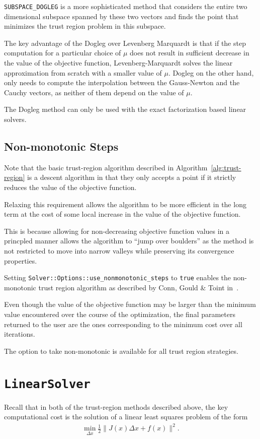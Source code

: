  \texttt{SUBSPACE\_DOGLEG} is a more sophisticated method
that considers the entire two dimensional subspace spanned by these
two vectors and finds the point that minimizes the trust region
problem in this subspace\cite{byrd1988approximate}.

The key advantage of the Dogleg over Levenberg Marquardt is that if the step computation for a particular choice of $\mu$ does not result in sufficient decrease in the value of the objective function, Levenberg-Marquardt solves the linear approximation from scratch with a smaller value of $\mu$. Dogleg on the other hand, only needs to compute the interpolation between the Gauss-Newton and the Cauchy vectors, as neither of them depend on the value of $\mu$.

The Dogleg method can only be used with the exact factorization based linear solvers.

\subsection{Non-monotonic Steps}
\label{sec:non-monotic}
Note that the basic trust-region algorithm described in
Algorithm~\ref{alg:trust-region} is a descent algorithm  in that they
only accepts a point if it strictly reduces the value of the objective
function.

Relaxing this requirement allows the algorithm to be more
efficient in the long term at the cost of some local increase
in the value of the objective function.

This is because allowing for non-decreasing objective function
values in a princpled manner allows the algorithm to ``jump over
boulders'' as the method is not restricted to move into narrow
valleys while preserving its convergence properties.

Setting \texttt{Solver::Options::use\_nonmonotonic\_steps} to \texttt{true}
enables the non-monotonic trust region algorithm as described by
Conn,  Gould \& Toint in~\cite{conn2000trust}.

Even though the value of the objective function may be larger
than the minimum value encountered over the course of the
optimization, the final parameters returned to the user are the
ones corresponding to the minimum cost over all iterations.

The option to take non-monotonic is available for all trust region
strategies.

\section{\texttt{LinearSolver}}
Recall that in both of the trust-region methods described above, the key computational cost is the solution of a linear least squares problem of the form
\begin{align}
 \min_{\Delta x} \frac{1}{2} \|J(x)\Delta x + f(x)\|^2 .
 \label{eq:simple2}
\end{align}


